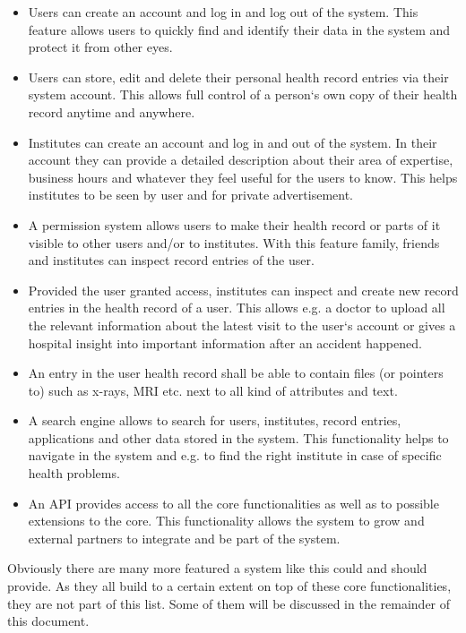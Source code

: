 \begin{itemize}
	\item Users can create an account and log in and log out of the system. This feature allows users to quickly find and identify their data in the system and protect it from other eyes. 
	\item Users can store, edit and delete their personal health record entries via their system account. This allows full control of a person`s own copy of their health record anytime and anywhere. 
	\item Institutes can create an account and log in and out of the system. In their account they can provide a detailed description about their area of expertise, business hours and whatever they feel useful for the users to know. This helps institutes to be seen by user and for private advertisement. 
	\item A permission system allows users to make their health record or parts of it visible to other users and/or to institutes. With this feature family, friends and institutes can inspect record entries of the user.
	\item Provided the user granted access, institutes can inspect and create new record entries in the health record of a user. This allows e.g. a doctor to upload all the relevant information about the latest visit to the user`s account or gives a hospital insight into important information after an accident happened. 
	\item An entry in the user health record shall be able to contain files (or pointers to) such as x-rays, MRI etc. next to all kind of attributes and text.
	\item A search engine allows to search for users, institutes, record entries, applications and other data stored in the system. This functionality helps to navigate in the system and e.g. to find the right institute in case of specific health problems.
	\item An API provides access to all the core functionalities as well as to possible extensions to the core. This functionality allows the system to grow and external partners to integrate and be part of the system. 
\end{itemize}  

Obviously there are many more featured a system like this could and should provide. As they all build to a certain extent on top of these core functionalities, they are not part of this list. Some of them will be discussed in the remainder of this document.
 

